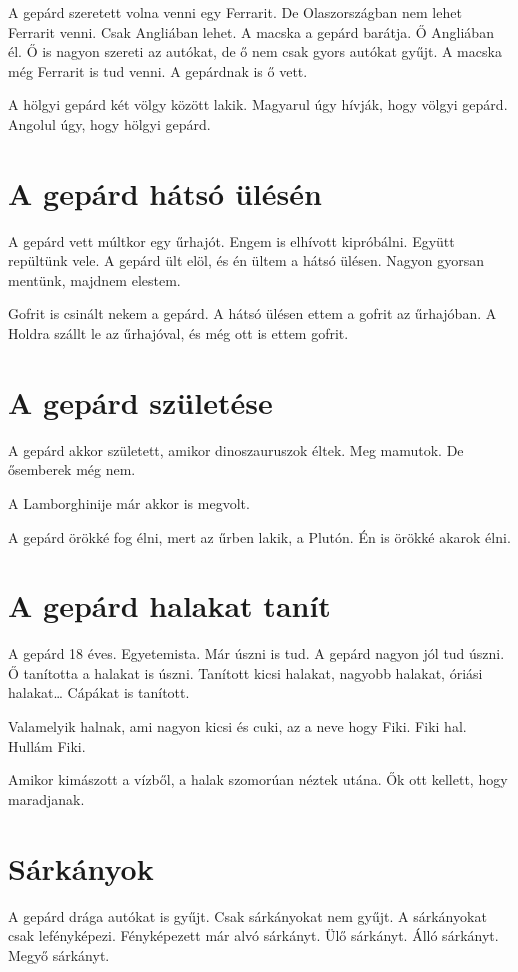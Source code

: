 \documentclass[12pt]{memoir}
\newcommand{\image}[1]{%
\incgraph[documentpaper][keepaspectratio=true,width=\paperwidth,height=\paperheight]{#1}}
\begin{document}
A gepárd szeretett volna venni egy Ferrarit. De Olaszországban nem lehet
Ferrarit venni. Csak Angliában lehet. A macska a gepárd barátja. Ő Angliában
él. Ő is nagyon szereti az autókat, de ő nem csak gyors autókat gyűjt. A macska
még Ferrarit is tud venni. A gepárdnak is ő vett.

A hölgyi gepárd két völgy között lakik. Magyarul úgy hívják, hogy völgyi
gepárd. Angolul úgy, hogy hölgyi gepárd.
\cleartoverso


\section{A gepárd hátsó ülésén}
A gepárd vett múltkor egy űrhajót. Engem is elhívott kipróbálni. Együtt
repültünk vele. A gepárd ült elöl, és én ültem a hátsó ülésen. Nagyon gyorsan
mentünk, majdnem elestem.

Gofrit is csinált nekem a gepárd. A hátsó ülésen ettem a gofrit az űrhajóban. A
Holdra szállt le az űrhajóval, és még ott is ettem gofrit.
\cleartoverso

 
\section{A gepárd születése}
A gepárd akkor született, amikor dinoszauruszok éltek. Meg mamutok. De
ősemberek még nem.

A Lamborghinije már akkor is megvolt.

A gepárd örökké fog élni, mert az űrben lakik, a Plutón. Én is örökké akarok
élni.
\image{gepard.png}


\section{A gepárd halakat tanít}
A gepárd 18 éves. Egyetemista. Már úszni is tud. A gepárd nagyon jól tud úszni.
Ő tanította a halakat is úszni. Tanított kicsi halakat, nagyobb halakat, óriási
halakat… Cápákat is tanított.

Valamelyik halnak, ami nagyon kicsi és cuki, az a neve hogy Fiki. Fiki hal.
Hullám Fiki.

Amikor kimászott a vízből, a halak szomorúan néztek utána. Ők ott kellett, hogy
maradjanak.
\cleartoverso


\section{Sárkányok}
A gepárd drága autókat is gyűjt. Csak sárkányokat nem gyűjt. A sárkányokat csak
lefényképezi. Fényképezett már alvó sárkányt. Ülő sárkányt. Álló sárkányt.
Megyő sárkányt.
\end{document}
